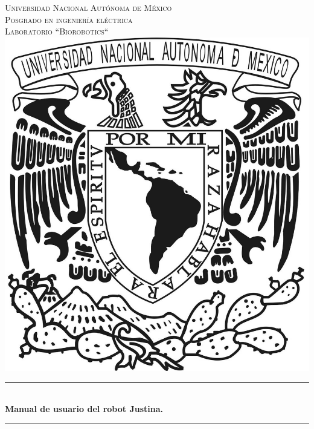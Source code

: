 \documentclass[user_manual.tex]{subfiles}
\begin{document}
 
\begin{titlepage}

\newcommand{\HRule}{\rule{\linewidth}{0.5mm}} 
\begin{center}


\textsc{\LARGE Universidad Nacional Autónoma de México}\\[1cm] 
\textsc{\Large Posgrado en ingeniería eléctrica}\\[0.5cm] 
\textsc{\large Laboratorio ``Biorobotics``}\\[1.5cm] 

\includegraphics[scale=0.8]{unam}\\[1.5cm]


\HRule \\[0.4cm]
{ \LARGE \bfseries Manual de usuario del robot Justina.}\\[0.4cm] 
\HRule \\[0.4cm]
 

\vfill 

\end{center}
\end{titlepage}
\end{document}
